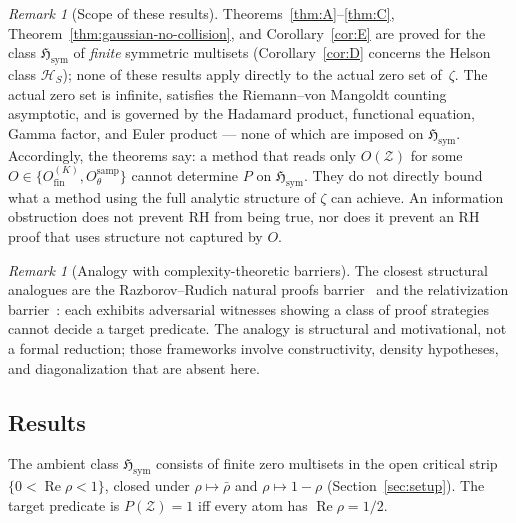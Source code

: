 \documentclass[12pt]{amsart}
\theoremstyle{definition}
\theoremstyle{remark}
\newtheorem{remark}[definition]{Remark}
\theoremstyle{plain}
\newcommand{\Hsym}{\mathfrak{H}_{\mathrm{sym}}}
\newcommand{\Ofinite}{O_{\mathrm{fin}}}
\newcommand{\Otheta}{O_{\theta}^{\mathrm{samp}}}
\newcommand{\re}{\operatorname{Re}}
\begin{document}
\begin{remark}[Scope of these results]
Theorems~\ref{thm:A}--\ref{thm:C}, Theorem~\ref{thm:gaussian-no-collision},
and Corollary~\ref{cor:E} are proved for the class $\Hsym$ of
\emph{finite} symmetric multisets (Corollary~\ref{cor:D} concerns the Helson
class $\mathcal{H}_S$); none of these results apply directly to the
actual zero set of~$\zeta$.  The actual
zero set is infinite, satisfies the Riemann--von Mangoldt counting
asymptotic, and is governed by the Hadamard product, functional equation,
Gamma factor, and Euler product --- none of which are imposed on $\Hsym$.
Accordingly, the theorems say: a method that reads only $O(\mathcal{Z})$
for some $O \in \{\Ofinite^{(K)}, \Otheta\}$ cannot determine $P$ on
$\Hsym$.  They do not directly bound what a method using the full analytic
structure of $\zeta$ can achieve.
An information obstruction does not prevent RH from being true, nor does it
prevent an RH proof that uses structure not captured by $O$.
\end{remark}

\begin{remark}[Analogy with complexity-theoretic barriers]
The closest structural analogues are the Razborov--Rudich natural
proofs barrier~\cite{RazborovRudich1997} and the relativization
barrier~\cite{BakerGillSolovay1975}: each exhibits adversarial witnesses
showing a class of proof strategies cannot decide a target predicate.
The analogy is structural and motivational, not a formal reduction;
those frameworks involve constructivity, density hypotheses, and
diagonalization that are absent here.
\end{remark}

\subsection*{Results}

The ambient class $\Hsym$ consists of finite zero multisets in the open
critical strip $\{0 < \re \rho < 1\}$, closed under $\rho \mapsto \bar\rho$
and $\rho \mapsto 1 - \rho$ (Section~\ref{sec:setup}).  The target
predicate is $P(\mathcal{Z}) = 1$ iff every atom has $\re \rho = 1/2$.
\end{document}

